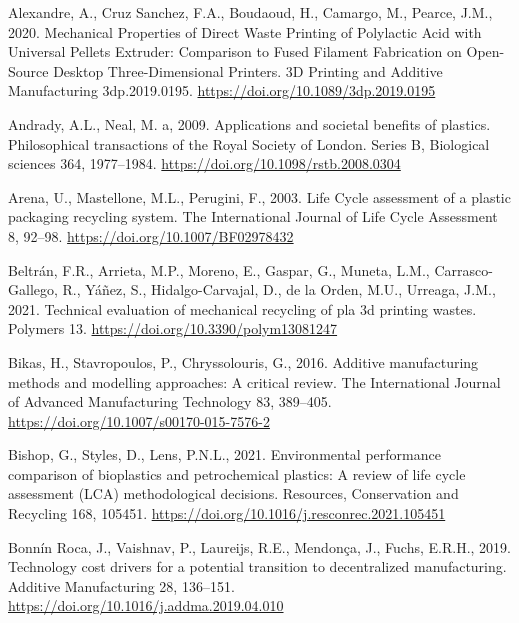 \documentclass[12pt]{elsarticle} %
\newlength{\cslhangindent}
\newlength{\cslentryspacingunit} %
\newenvironment{CSLReferences}[2] %
 {%
  \setlength{\parindent}{0pt}
  \ifodd #1
  \let\oldpar\par
  \def\par{\hangindent=\cslhangindent\oldpar}
  \fi
  \setlength{\parskip}{#2\cslentryspacingunit}
 }%
 {}
\begin{document}
\hypertarget{refs}{}
\begin{CSLReferences}{1}{0}
\leavevmode{}%
Alexandre, A., Cruz Sanchez, F.A., Boudaoud, H., Camargo, M., Pearce, J.M., 2020. Mechanical {Properties} of {Direct Waste Printing} of {Polylactic Acid} with {Universal Pellets Extruder}: {Comparison} to {Fused Filament Fabrication} on {Open-Source Desktop Three-Dimensional Printers}. 3D Printing and Additive Manufacturing 3dp.2019.0195. \url{https://doi.org/10.1089/3dp.2019.0195}

\leavevmode{}%
Andrady, A.L., Neal, M. a, 2009. Applications and societal benefits of plastics. Philosophical transactions of the Royal Society of London. Series B, Biological sciences 364, 1977--1984. \url{https://doi.org/10.1098/rstb.2008.0304}

\leavevmode{}%
Arena, U., Mastellone, M.L., Perugini, F., 2003. Life {Cycle} assessment of a plastic packaging recycling system. The International Journal of Life Cycle Assessment 8, 92--98. \url{https://doi.org/10.1007/BF02978432}

\leavevmode{}%
Beltrán, F.R., Arrieta, M.P., Moreno, E., Gaspar, G., Muneta, L.M., Carrasco-Gallego, R., Yáñez, S., Hidalgo-Carvajal, D., de la Orden, M.U., Urreaga, J.M., 2021. Technical evaluation of mechanical recycling of pla 3d printing wastes. Polymers 13. \url{https://doi.org/10.3390/polym13081247}

\leavevmode{}%
Bikas, H., Stavropoulos, P., Chryssolouris, G., 2016. Additive manufacturing methods and modelling approaches: A critical review. The International Journal of Advanced Manufacturing Technology 83, 389--405. \url{https://doi.org/10.1007/s00170-015-7576-2}

\leavevmode{}%
Bishop, G., Styles, D., Lens, P.N.L., 2021. Environmental performance comparison of bioplastics and petrochemical plastics: {A} review of life cycle assessment ({LCA}) methodological decisions. Resources, Conservation and Recycling 168, 105451. \url{https://doi.org/10.1016/j.resconrec.2021.105451}

\leavevmode{}%
Bonnín Roca, J., Vaishnav, P., Laureijs, R.E., Mendonça, J., Fuchs, E.R.H., 2019. Technology cost drivers for a potential transition to decentralized manufacturing. Additive Manufacturing 28, 136--151. \url{https://doi.org/10.1016/j.addma.2019.04.010}


\end{CSLReferences}
\end{document}
